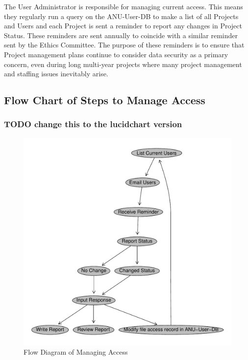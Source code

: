 \documentclass[a4paper]{article}
\begin{document}
The User Administrator is responsible for managing current access.  This means they regularly run a query on the ANU-User-DB to make a list of all Projects and Users and each Project is sent a reminder to report any changes in Project Status.  These reminders are sent annually to coincide with a similar reminder sent by the Ethics Committee.  The purpose of these reminders is to ensure that Project management plans continue to consider data security as a primary concern, even during long multi-year projects where many project management and staffing issues inevitably arise.
\subsection{Flow Chart of Steps to Manage Access}
\label{sec-4-1}
\subsubsection{\textbf{TODO} change this to the lucidchart version}
\label{sec-4-1-1}

\begin{figure}[!h]
\centering
\includegraphics[width=\textwidth]{DataAccessFlowDiagram-ManagingAccess.pdf}
\caption{Flow Diagram of Managing Access}
\label{fig:DataAccessFlowDiagram-ManagingAccess}
\end{figure}
\clearpage
\end{document}
